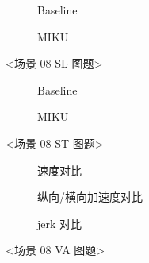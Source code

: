 \begin{figure}[H]
\centering
\begin{subfigure}[b]{\textwidth}
  \centering
  
  \caption{Baseline}
  \label{fig:exp_08_dense_construction_cmp_sl:a}
\end{subfigure}

\begin{subfigure}[b]{\textwidth}
  \centering
  
  \caption{MIKU}
  \label{fig:exp_08_dense_construction_cmp_sl:b}
\end{subfigure}
\caption{<场景 08 SL 图题>}
\label{fig:exp_08_dense_construction_cmp_sl}
\end{figure}

\begin{figure}[H]
\centering
\begin{subfigure}[b]{0.48\textwidth}
  \centering
  
  \caption{Baseline}
  \label{fig:exp_08_dense_construction_cmp_st:a}
\end{subfigure}\hfill
\begin{subfigure}[b]{0.48\textwidth}
  \centering
  
  \caption{MIKU}
  \label{fig:exp_08_dense_construction_cmp_st:b}
\end{subfigure}
\caption{<场景 08 ST 图题>}
\label{fig:exp_08_dense_construction_cmp_st}
\end{figure}

\begin{figure}[H]
\centering
\begin{subfigure}[b]{\textwidth}
  \centering
  
  \caption{速度对比}
  \label{fig:exp_08_dense_construction_cmp_va:a}
\end{subfigure}

\begin{subfigure}[b]{\textwidth}
  \centering
  
  \caption{纵向/横向加速度对比}
  \label{fig:exp_08_dense_construction_cmp_va:b}
\end{subfigure}

\begin{subfigure}[b]{\textwidth}
  \centering
  
  \caption{jerk 对比}
  \label{fig:exp_08_dense_construction_cmp_va:c}
\end{subfigure}
\caption{<场景 08 VA 图题>}
\label{fig:exp_08_dense_construction_cmp_va}
\end{figure}
